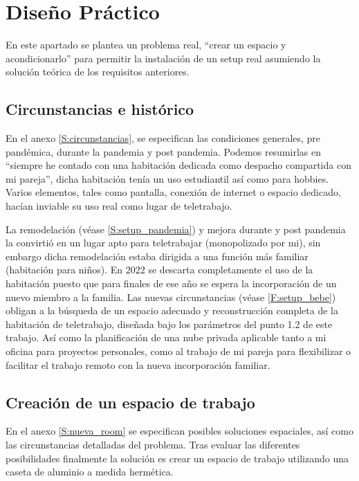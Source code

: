  \section{Diseño Práctico}

 En este apartado se plantea un problema real, “crear un espacio y acondicionarlo” para permitir la instalación de un setup real asumiendo la solución teórica de los requisitos anteriores.

\subsection{Circunstancias e histórico}

En el anexo \ref{S:circunstancias}, se especifican las condiciones generales, pre pandémica, durante la pandemia y post pandemia. Podemos resumirlas en “siempre he contado con una habitación dedicada como despacho compartida con mi pareja”, dicha habitación tenía un uso estudiantil así como para hobbies. Varios elementos, tales como pantalla, conexión de internet o espacio dedicado, hacían inviable su uso real como lugar de teletrabajo. 

La remodelación (véase \ref{S:setup_pandemia}) y mejora durante y post pandemia la convirtió en un lugar apto para teletrabajar (monopolizado por mi), sin embargo dicha remodelación estaba dirigida a una función más familiar (habitación para niños).  En 2022 se descarta completamente el uso de la habitación puesto que para finales de ese año se espera la incorporación de un nuevo miembro a la familia. Las nuevas circunstancias (véase \ref{F:setup_bebe}) obligan a la búsqueda de un espacio adecuado y reconstrucción completa de la habitación de teletrabajo, diseñada bajo los parámetros del punto 1.2 de este trabajo. Así como la planificación de una nube privada aplicable tanto a mi oficina para proyectos personales, como al trabajo de mi pareja para flexibilizar o facilitar el trabajo remoto con la nueva incorporación familiar.

\subsection{Creación de un espacio de trabajo}

En el anexo \ref{S:nueva_room} se especifican posibles soluciones espaciales, así como las circunstancias detalladas del problema. Tras evaluar las diferentes posibilidades finalmente la solución es crear un espacio de trabajo utilizando una caseta de aluminio a medida hermética.

